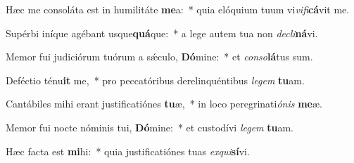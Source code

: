 \item Hæc me consoláta est in humilitáte \textbf{me}a:~* quia elóquium tuum vi\textit{vi}\textit{fi}\textbf{cá}vit me.
\item Supérbi iníque agébant usque\textbf{quá}que:~* a lege autem tua non \textit{de}\textit{cli}\textbf{ná}vi.
\item Memor fui judiciórum tuórum a sǽculo, \textbf{Dó}mine:~* et \textit{con}\textit{so}\textbf{lá}tus sum.
\item Deféctio ténu\textbf{it} me,~* pro peccatóribus derelinquéntibus \textit{le}\textit{gem} \textbf{tu}am.
\item Cantábiles mihi erant justificatiónes \textbf{tu}æ,~* in loco peregrinati\textit{ó}\textit{nis} \textbf{me}æ.
\item Memor fui nocte nóminis tui, \textbf{Dó}mine:~* et custodívi \textit{le}\textit{gem} \textbf{tu}am.
\item Hæc facta est \textbf{mi}hi:~* quia justificatiónes tuas \textit{ex}\textit{qui}\textbf{sí}vi.
